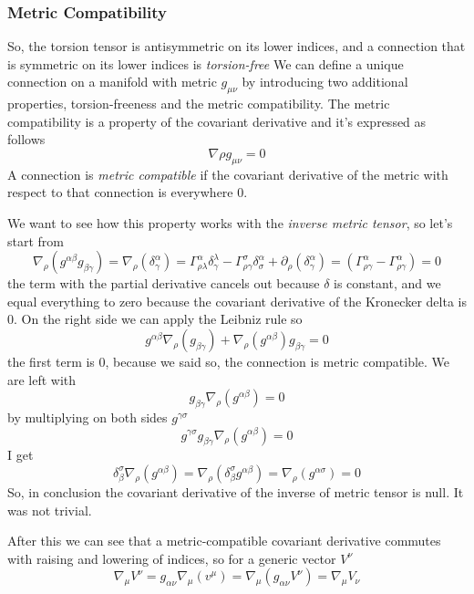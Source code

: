 \subsubsection{Metric Compatibility}
So, the torsion tensor is antisymmetric on its lower indices, and a connection that is symmetric on its lower indices is \emph{torsion-free}
We can define a unique connection on a manifold with metric $g_{\mu \nu }$ by introducing two additional properties, torsion-freeness and the metric compatibility.
The metric compatibility is a property of the covariant derivative and it's expressed as follows
\[
\nabla \rho g_{\mu \nu } = 0
\]
A connection is \emph{metric compatible} if the covariant derivative of the metric with respect to that connection is everywhere 0. \par
We want to see how this property works with the \emph{inverse metric tensor}, so let's start from
\begin{equation}
\nabla _{\rho } \left( g^{\alpha \beta } g_{\beta  \gamma } \right) =\nabla _{\rho } \left( \delta ^{\alpha }_{\gamma }  \right) = \Gamma ^{\alpha }_{\rho \lambda  }\delta^{\lambda }_{\gamma } - \Gamma ^{\sigma  }_{\rho \gamma }\delta^{\alpha }_{\sigma } + \partial_{\rho }\left( \delta ^{\alpha }_{\gamma } \right) = \left( \Gamma ^{\alpha }_{\rho  \gamma } - \Gamma ^{\alpha }_{\rho  \gamma } \right) = 0
\end{equation}
the term with the partial derivative cancels out because $\delta $ is constant, and we equal everything to zero because the covariant derivative of the Kronecker delta is 0. On the right side we can apply the Leibniz rule so
\begin{equation}
g^{\alpha \beta }\nabla _{\rho }\left( g_{\beta \gamma } \right) + \nabla _{\rho }\left( g^{\alpha \beta } \right)g_{\beta \gamma } = 0
\end{equation}
the first term is 0, because we said so, the connection is metric compatible. We are left with
\[
g_{\beta  \gamma }\nabla _{\rho }\left( g^{\alpha \beta } \right) = 0
\]
by multiplying on both sides $g^{\gamma \sigma }$
\[
g^{\gamma \sigma } g_{\beta \gamma } \nabla _{\rho } \left( g^{\alpha \beta } \right) =0
\]
I get
\[
\delta ^{\sigma }_{\beta }\nabla _{\rho }\left( g^{\alpha \beta } \right) = \nabla _{\rho }\left( \delta ^{\sigma }_{\beta } g^{\alpha \beta } \right) = \nabla _{\rho }\left( g^{\alpha \sigma } \right) = 0
\]
So, in conclusion the covariant derivative of the inverse of metric tensor is null. It was not trivial.

After this we can see that a metric-compatible covariant derivative commutes with raising and lowering of indices, so for a generic vector $V^{\nu }$
\[
\nabla _{\mu }V^{\nu } = g_{\alpha \nu }\nabla _{\mu }\left( v^{\mu } \right) = \nabla _{\mu }\left( g_{\alpha \nu }V^{\nu } \right) = \nabla _{\mu }V_{\nu }
\]

